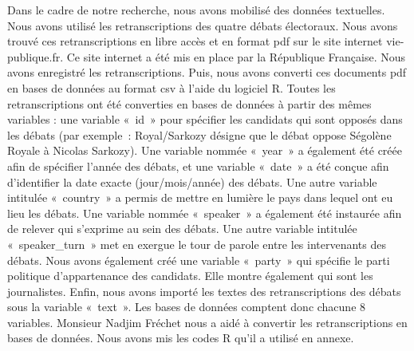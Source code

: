 \documentclass[
  letterpaper,
  DIV=11,
  numbers=noendperiod]{scrartcl}
\begin{document}
Dans le cadre de notre recherche, nous avons mobilisé des données
textuelles. Nous avons utilisé les retranscriptions des quatre débats
électoraux. Nous avons trouvé ces retranscriptions en libre accès et en
format pdf sur le site internet vie-publique.fr. Ce site internet a été
mis en place par la République Française. Nous avons enregistré les
retranscriptions. Puis, nous avons converti ces documents pdf en bases
de données au format csv à l'aide du logiciel R. Toutes les
retranscriptions ont été converties en bases de données à partir des
mêmes variables : une variable «~id~» pour spécifier les candidats qui
sont opposés dans les débats (par exemple~: Royal/Sarkozy désigne que le
débat oppose Ségolène Royale à Nicolas Sarkozy). Une variable nommée
«~year~» a également été créée afin de spécifier l'année des débats, et
une variable «~date~» a été conçue afin d'identifier la date exacte
(jour/mois/année) des débats. Une autre variable intitulée «~country~» a
permis de mettre en lumière le pays dans lequel ont eu lieu les débats.
Une variable nommée «~speaker~» a également été instaurée afin de
relever qui s'exprime au sein des débats. Une autre variable intitulée
«~speaker\_turn~» met en exergue le tour de parole entre les
intervenants des débats. Nous avons également créé une variable
«~party~» qui spécifie le parti politique d'appartenance des candidats.
Elle montre également qui sont les journalistes. Enfin, nous avons
importé les textes des retranscriptions des débats sous la variable
«~text~». Les bases de données comptent donc chacune 8 variables.
Monsieur Nadjim Fréchet nous a aidé à convertir les retranscriptions en
bases de données. Nous avons mis les codes R qu'il a utilisé en annexe.
\end{document}
